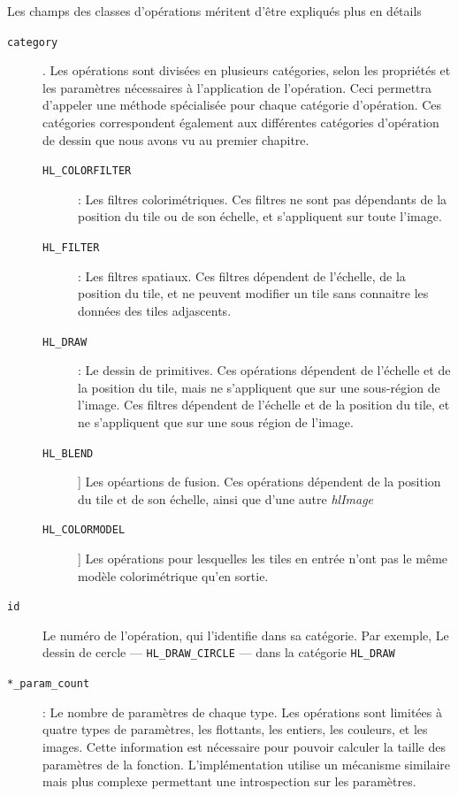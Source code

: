 			Les champs des classes d'opérations méritent d'être expliqués plus en détails	
			\begin{description}
				\item[\texttt{category}]. Les opérations sont divisées en plusieurs catégories, selon les propriétés et les paramètres
				nécessaires à l'application de l'opération. Ceci permettra d'appeler une méthode spécialisée pour chaque catégorie d'opération.
				Ces catégories correspondent également aux différentes catégories d'opération de dessin que nous avons vu au premier chapitre. 
				\begin{description}
					\item[\texttt{HL\_COLORFILTER}]: Les filtres colorimétriques. Ces filtres ne sont pas dépendants de la position du tile ou de son échelle, et s'appliquent
					sur toute l'image. 
					\item[\texttt{HL\_FILTER}]: Les filtres spatiaux. Ces filtres dépendent de l'échelle, de la position du tile, 
					et ne peuvent modifier un tile sans connaitre les données des tiles adjascents.
					\item[\texttt{HL\_DRAW}]: Le dessin de primitives. Ces opérations dépendent de l'échelle et de la position du tile, 
					mais ne s'appliquent que sur une sous-région de l'image.
					 Ces filtres dépendent de l'échelle et de la position du tile, et ne s'appliquent que sur
					une sous région de l'image.
					\item[\texttt{HL\_BLEND}]] Les opéartions de fusion. Ces opérations dépendent de la position du tile et de son échelle, 
					ainsi que d'une autre \emph{hlImage}
					\item[\texttt{HL\_COLORMODEL}]] Les opérations pour lesquelles les tiles en entrée n'ont pas le même modèle colorimétrique
					qu'en sortie. 
				\end{description}
				\item[\texttt{id}]Le numéro de l'opération, qui l'identifie dans sa catégorie. Par exemple, Le dessin de cercle 
				--- \texttt{HL\_DRAW\_CIRCLE} --- dans 
				la catégorie \texttt{HL\_DRAW}
				\item[\texttt{*\_param\_count}]: Le nombre de paramètres de chaque type. Les opérations sont limitées à quatre types de paramètres,
				les flottants, les entiers, les couleurs, et les images. Cette information est nécessaire pour pouvoir calculer la taille des 
				paramètres de la fonction. L'implémentation utilise un mécanisme similaire mais plus complexe permettant une introspection sur les
				paramètres.
			\end{description}
